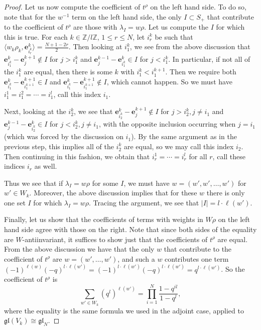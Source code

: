\documentclass[12pt]{article}
\renewcommand{\b}[1]{\textbf{#1}}
\newcommand{\Z}{\mathbb{Z}}
\theoremstyle{definition}
\theoremstyle{remark}
\newcommand{\gl}{\mathfrak{gl}}
\begin{document}
\begin{proof}
    Let us now compute the coefficient of $t^\rho$ on the left hand side. To do so, note that for the $w^{-1}$ term on the left hand side, the only $I\subset S_+$ that contribute to the coefficient of $t^\rho$ are those with $\lambda_I=w\rho$. Let us compute the $I$ for which this is true. For each $k\in\Z/l\Z$, $1\leq r\leq N$, let $i_r^k$ be such that $\langle w_k\rho_k,\b{e}_{i_r^k}^k\rangle=\frac{N+1-2r}{2}$. Then looking at $i_1^k$, we see from the above discussion that $\b{e}_{i_1^k}^k-\b{e}_j^{k+1}\not\in I$ for $j>i_1^k$ and $\b{e}_j^{k-1}-\b{e}_{i_1^k}^k\in I$ for $j<i_1^k$. In particular, if not all of the $i_1^k$ are equal, then there is some $k$ with $i_1^k<i_1^{k+1}$. Then we require both $\b{e}_{i_1^k}^k-\b{e}_{i_1^{k+1}}^{k+1}\in I$ and $\b{e}_{i_1^k}^k-\b{e}_{i_1^{k+1}}^{k+1}\not\in I$, which cannot happen. So we must have $i_1^1=i_1^2=\cdots=i_1^l$, call this index $i_1$.

    Next, looking at the $i_2^k$, we see that $\b{e}_{i_2^k}^k-\b{e}_j^{k+1}\not\in I$ for $j>i_2^k, j\neq i_1$ and $\b{e}_j^{k-1}-\b{e}_{i_2^k}^k\in I$ for $j<i_2^k, j\neq i_1$, with the opposite inclusion occurring when $j=i_1$ (which was forced by the discussion on $i_1$). By the same argument as in the previous step, this implies all of the $i_2^k$ are equal, so we may call this index $i_2$. Then continuing in this fashion, we obtain that $i_r^1=\cdots=i_r^l$ for all $r$, call these indices $i_r$ as well.

    Thus we see that if $\lambda_I=w\rho$ for some $I$, we must have $w=(w',w',\dots,w')$ for $w'\in W_k$. Moreover, the above discussion implies that for these $w$ there is only one set $I$ for which $\lambda_I=w\rho$. Tracing the argument, we see that $|I|=l\cdot\ell(w')$.

    Finally, let us show that the coefficients of terms with weights in $W\rho$ on the left hand side agree with those on the right. Note that since both sides of the equality are $W$-antiinvariant, it suffices to show just that the coefficients of $t^\rho$ are equal. From the above discussion we have that the only $w$ that contribute to the coefficient of $t^\rho$ are $w=(w',\dots,w')$, and such a $w$ contributes one term $(-1)^{\ell(w)}(-q)^{l\cdot\ell(w')}=(-1)^{l\cdot\ell(w')}(-q)^{l\cdot\ell(w')}=q^{l\cdot\ell(w')}$. So the coefficient of $t^\rho$ is
    \[\sum_{w'\in W_k}(q^l)^{\ell(w')}=\prod_{i=1}^N\frac{1-q^{il}}{1-q^l},\]
    where the equality is the same formula we used in the adjoint case, applied to $\gl(V_k)\cong\gl_N$.
\end{proof}
\end{document}
